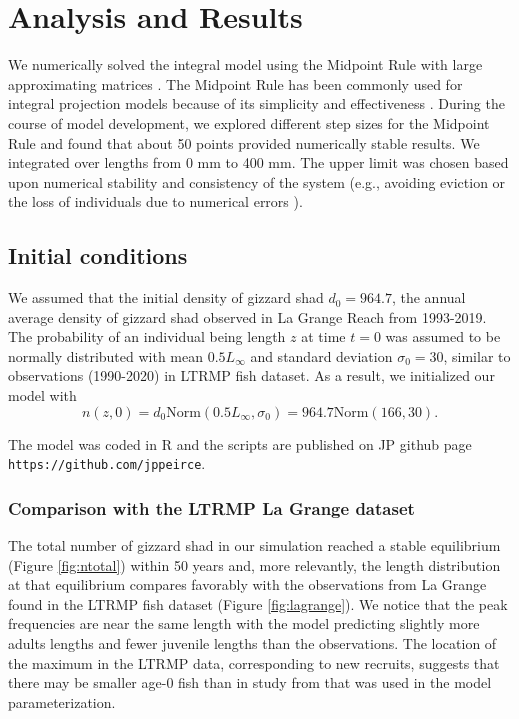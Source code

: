 \documentclass[preprint,review,12pt,authoryear]{elsarticle}
\begin{document}
\section{Analysis and Results}
We numerically solved the integral model using the Midpoint Rule with large approximating matrices \citep{burden2005numerical}. 
The Midpoint Rule has been commonly used for integral projection models because of its simplicity and effectiveness \citep{ellner2006integral, ramula2009integral,  merow2014advancing}. 
During the course of model development, we explored different step sizes for the Midpoint Rule and found that about 50 points provided numerically stable results. 
We integrated over lengths from 0 mm to 400 mm. 
The upper limit was chosen based upon numerical stability and consistency of the system (e.g., avoiding eviction or the loss of individuals due to numerical errors \citep{williams2012avoiding}). 

\subsection{Initial conditions}  We assumed that the initial density of gizzard shad $d_0 = 964.7$, the annual average density of gizzard shad observed in La Grange Reach from 1993-2019.  
The probability of an individual being length $z$ at time $t=0$  was assumed to be normally distributed with mean $0.5L_\infty$ and standard deviation $\sigma_0 = 30$, similar to observations (1990-2020) in LTRMP fish dataset.  
As a result, we initialized our model with
\begin{equation}\label{eq:n}
 n(z,0) = d_0 \mbox{Norm} (0.5 L_\infty, \sigma_0) = 964.7 \mbox{Norm} (166, 30). 
 \end{equation}

The model was coded in R \citep{R} and the scripts are published on JP github page \verb+https://github.com/jppeirce+.

\subsubsection{Comparison with the LTRMP La Grange dataset}
The total number of gizzard shad in our simulation reached a stable equilibrium (Figure \ref{fig:ntotal}) within 50 years and, more relevantly, the length distribution at that equilibrium compares favorably with the observations from La Grange found in the LTRMP fish dataset (Figure \ref{fig:lagrange}). 
We notice that the peak frequencies are near the same length with the model predicting slightly more adults lengths and fewer juvenile lengths than the observations. 
The location of the maximum in the LTRMP data, corresponding to new recruits, suggests that there may be smaller age-0 fish than in study from \citep{michaletz2017variation} that was used in the model parameterization.  
\end{document}
